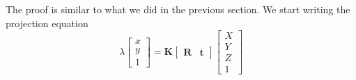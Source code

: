 The proof is similar to what we did in the previous section. We start writing the projection equation 
\begin{equation}
    \lambda 
    \begin{bmatrix}
    x \\
    y \\
    1
    \end{bmatrix}
    =
    \mathbf{K}  
    \begin{bmatrix}
    \mathbf{R} & \mathbf{t} 
    \end{bmatrix}
    \begin{bmatrix}
    X \\
    Y \\
    Z \\
    1
    \end{bmatrix} 
\end{equation}

